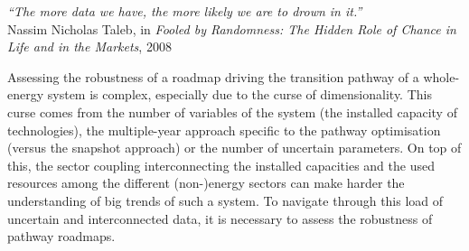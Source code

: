 \vspace{-0.2cm}
\begin{flushright}
\emph{``The more data we have, the more likely we are to drown in it.''}\\
Nassim Nicholas Taleb, in \textit{Fooled by Randomness: The Hidden Role of Chance in Life and in the Markets}, 2008
\end{flushright}
\vspace{0.4cm}

Assessing the robustness of a roadmap driving the transition pathway of a whole-energy system is complex, especially due to the curse of dimensionality. This curse comes from the number of variables of the system (\eg the installed capacity of technologies), the multiple-year approach specific to the pathway optimisation (\ie versus the snapshot approach) or the number of uncertain parameters. On top of this, the sector coupling interconnecting the installed capacities and the used resources among the different (non-)energy sectors can make harder the understanding of big trends of such a system. To navigate through this load of uncertain and interconnected data, it is necessary to assess the robustness of pathway roadmaps.

